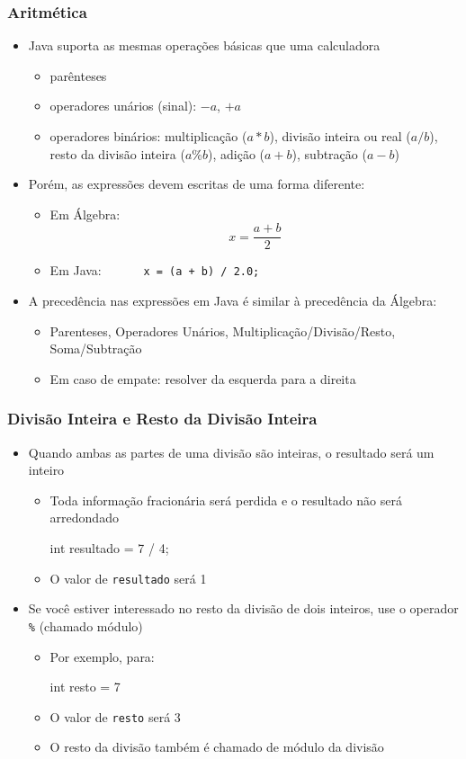 \documentclass[xcolor={dvipsnames,table},aspectratio=169]{beamer}
\begin{document}
\begin{frame}\frametitle{Aritmética}
\begin{itemize}
	\item Java suporta as mesmas operações básicas que uma calculadora
	\begin{itemize}
		\item parênteses
		\item operadores unários (sinal): $-a$, $+a$
		\item operadores binários: multiplicação ($a*b$), divisão inteira ou real ($a/b$), resto da divisão inteira ($a\%b$), adição ($a+b$), subtração ($a-b$)
	\end{itemize}
	\item Porém, as expressões devem escritas de uma forma diferente:
	\begin{itemize}
		\item Em Álgebra: \[x = \frac{a+b}{2}\]
		\item Em Java: ~ ~ ~ ~\texttt{x = (a + b) / 2.0;}
	\end{itemize}
	\item A precedência nas expressões em Java é similar à precedência da Álgebra:
	\begin{itemize}
		\item Parenteses, Operadores Unários, Multiplicação/Divisão/Resto, Soma/Subtração
		\item Em caso de empate: resolver da esquerda para a direita
	\end{itemize}
\end{itemize}
\end{frame}

\begin{frame}[fragile]\frametitle{Divisão Inteira e Resto da Divisão Inteira}
\begin{itemize}
	\item Quando ambas as partes de uma divisão são inteiras, o resultado será um inteiro
	\begin{itemize}
		\item Toda informação fracionária será perdida e o resultado não será arredondado
\begin{javacode}
int resultado = 7 / 4;
\end{javacode}
		\item O valor de \texttt{resultado} será 1
	\end{itemize}
	\item Se você estiver interessado no resto da divisão de dois inteiros, use o operador \texttt{\%} (chamado módulo)
	\begin{itemize}
		\item Por exemplo, para:
\begin{javacode}
int resto = 7 %
\end{javacode}
		\item O valor de \texttt{resto} será 3
		\item O resto da divisão também é chamado de módulo da divisão
	\end{itemize}
\end{itemize}
\end{frame}
\end{document}
